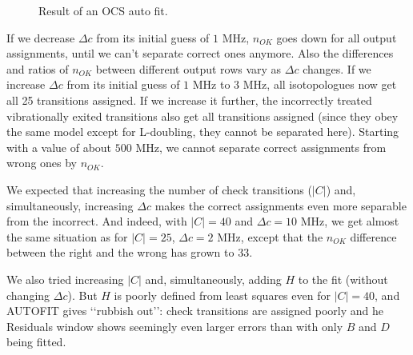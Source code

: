 \documentclass[11pt]{article}
\begin{document}
\begin{figure}[h]
\caption{\small Result of an OCS auto fit.}
\label{fig:ocs_first_try}
\end{figure}

If we decrease $\Delta c$ from its initial guess of $1$ MHz, $n_{OK}$ goes down for all output assignments, until we can't separate correct ones anymore. Also the differences and ratios of $n_{OK}$ between different output rows vary as $\Delta c$ changes. If we increase $\Delta c$ from  its initial guess of $1$ MHz to $3$ MHz, all isotopologues now get all 25 transitions assigned. If we increase it further, the incorrectly treated vibrationally exited transitions also get all transitions assigned (since they obey the same model except for L-doubling, they cannot be separated here). Starting with a value of about $500$ MHz, we cannot separate correct assignments from wrong ones by $n_{OK}$.

We expected that increasing the number of check transitions ($|C|$) and,  simultaneously, increasing $\Delta c$ makes the correct assignments even more separable from the incorrect. And indeed, with $|C| = 40$ and $\Delta c = 10$ MHz, we get almost the same situation as for $|C| = 25$, $\Delta c = 2$ MHz, except that the $n_{OK}$ difference between the right and the wrong has grown to $33$.

We also tried increasing $|C|$ and, simultaneously, adding $H$ to the fit (without changing $\Delta c$). But $H$ is poorly defined from least squares even for $|C| = 40$, and AUTOFIT gives \lq\lq{}rubbish out\rq\rq{}: check transitions are assigned poorly and he Residuals window shows seemingly even larger errors than with only $B$ and $D$ being fitted.
\end{document}
